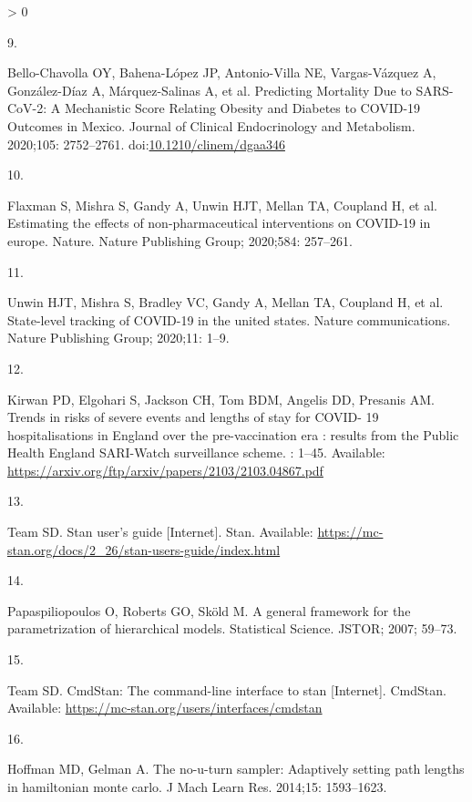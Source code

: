\documentclass[10pt,letterpaper]{article}
\newlength{\csllabelwidth}
\newlength{\cslhangindent}
\newenvironment{CSLReferences}[2] %
 {%
  \setlength{\parindent}{0pt}
  \ifodd #1 \everypar{\setlength{\hangindent}{\cslhangindent}}\ignorespaces\fi
  \ifnum #2 > 0
  \setlength{\parskip}{#2\baselineskip}
  \fi
 }%
 {}
\newcommand{\CSLLeftMargin}[1]{\parbox[t]{\csllabelwidth}{#1}}
\newcommand{\CSLRightInline}[1]{\parbox[t]{\linewidth - \csllabelwidth}{#1}\break}
\begin{document}
\begin{CSLReferences}{0}{0}
\leavevmode\hypertarget{ref-Bello-Chavolla2020}{}%
\CSLLeftMargin{9. }
\CSLRightInline{Bello-Chavolla OY, Bahena-López JP, Antonio-Villa NE,
Vargas-Vázquez A, González-Díaz A, Márquez-Salinas A, et al. {Predicting
Mortality Due to SARS-CoV-2: A Mechanistic Score Relating Obesity and
Diabetes to COVID-19 Outcomes in Mexico}. Journal of Clinical
Endocrinology and Metabolism. 2020;105: 2752--2761.
doi:\href{https://doi.org/10.1210/clinem/dgaa346}{10.1210/clinem/dgaa346}}

\leavevmode\hypertarget{ref-flaxman2020estimating}{}%
\CSLLeftMargin{10. }
\CSLRightInline{Flaxman S, Mishra S, Gandy A, Unwin HJT, Mellan TA,
Coupland H, et al. Estimating the effects of non-pharmaceutical
interventions on COVID-19 in europe. Nature. Nature Publishing Group;
2020;584: 257--261. }

\leavevmode\hypertarget{ref-unwin2020state}{}%
\CSLLeftMargin{11. }
\CSLRightInline{Unwin HJT, Mishra S, Bradley VC, Gandy A, Mellan TA,
Coupland H, et al. State-level tracking of COVID-19 in the united
states. Nature communications. Nature Publishing Group; 2020;11: 1--9. }

\leavevmode\hypertarget{ref-Kirwan}{}%
\CSLLeftMargin{12. }
\CSLRightInline{Kirwan PD, Elgohari S, Jackson CH, Tom BDM, Angelis DD,
Presanis AM. {Trends in risks of severe events and lengths of stay for
COVID- 19 hospitalisations in England over the pre-vaccination era :
results from the Public Health England SARI-Watch surveillance scheme}.
: 1--45. Available:
\url{https://arxiv.org/ftp/arxiv/papers/2103/2103.04867.pdf}}

\leavevmode\hypertarget{ref-stanmanual}{}%
\CSLLeftMargin{13. }
\CSLRightInline{Team SD. Stan user's guide {[}Internet{]}. Stan.
Available:
\url{https://mc-stan.org/docs/2_26/stan-users-guide/index.html}}

\leavevmode\hypertarget{ref-papaspiliopoulos2007general}{}%
\CSLLeftMargin{14. }
\CSLRightInline{Papaspiliopoulos O, Roberts GO, Sköld M. A general
framework for the parametrization of hierarchical models. Statistical
Science. JSTOR; 2007; 59--73. }

\leavevmode\hypertarget{ref-standevelopment}{}%
\CSLLeftMargin{15. }
\CSLRightInline{Team SD. CmdStan: The command-line interface to stan
{[}Internet{]}. CmdStan. Available:
\url{https://mc-stan.org/users/interfaces/cmdstan}}

\leavevmode\hypertarget{ref-hoffman2014no}{}%
\CSLLeftMargin{16. }
\CSLRightInline{Hoffman MD, Gelman A. The no-u-turn sampler: Adaptively
setting path lengths in hamiltonian monte carlo. J Mach Learn Res.
2014;15: 1593--1623. }


\end{CSLReferences}
\end{document}
